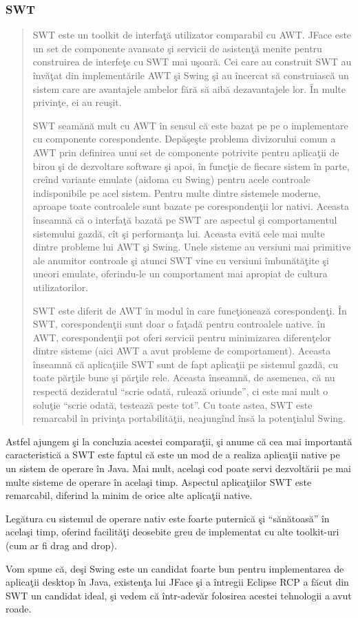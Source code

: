 \subsubsection{SWT}

\begin{quotation}

SWT este un toolkit de interfaţă utilizator comparabil cu AWT. JFace este un set
de componente avansate şi servicii de asistenţă menite pentru construirea de
interfeţe cu SWT mai uşoară. Cei care au construit SWT au învăţat din
implementările AWT şi Swing şi au încercat să construiască un sistem care are
avantajele ambelor fără să aibă dezavantajele lor. În multe privinţe, ei au
reuşit.

SWT seamănă mult cu AWT în sensul că este bazat pe pe o implementare cu
componente corespondente. Depăşeşte problema divizorului comun a AWT prin
definirea unui set de componente potrivite pentru aplicaţii de birou şi de
dezvoltare software şi apoi, în funcţie de fiecare sistem în parte, creînd
variante emulate (aidoma cu Swing) pentru acele controale indisponibile pe acel
sistem. Pentru multe dintre sistemele moderne, aproape toate controalele sunt
bazate pe corespondenţii lor nativi. Aceasta înseamnă că o interfaţă bazată pe
SWT are aspectul şi comportamentul sistemului gazdă, cît şi performanţa lui.
Aceasta evită cele mai multe dintre probleme lui AWT şi Swing. Unele sisteme au
versiuni mai primitive ale anumitor controale şi atunci SWT vine cu versiuni
îmbunătăţite şi uneori emulate, oferindu-le un comportament mai apropiat de
cultura utilizatorilor.

SWT este diferit de AWT în modul în care funcţionează corespondenţi. În SWT,
corespondenţii sunt doar o faţadă pentru controalele native. în AWT,
corespondenţii pot oferi servicii pentru minimizarea diferenţelor dintre sisteme
(aici AWT a avut probleme de comportament). Aceasta înseamnă că aplicaţiile SWT
sunt de fapt aplicaţii pe sistemul gazdă, cu toate părţile bune şi părţile rele.
Aceasta înseamnă, de asemenea, că nu respectă dezideratul ``scrie odată, rulează
oriunde'', ci este mai mult o soluţie ``scrie odată, testează peste tot''. Cu
toate astea, SWT este remarcabil în privinţa portabilităţii, neajungînd însă la
potenţialul Swing.
\cite{swtawtswing}
\end{quotation}

Astfel ajungem şi la concluzia acestei comparaţii, şi anume că cea mai
importantă caracteristică a SWT este faptul că este un mod de a realiza
aplicaţii native pe un sistem de operare în Java. Mai mult, acelaşi cod poate
servi dezvoltării pe mai multe sisteme de operare în acelaşi timp.  Aspectul
aplicaţiilor SWT este remarcabil, diferind la minim de orice alte aplicaţii
native.

Legătura cu sistemul de operare nativ este foarte puternică şi ``sănătoasă'' în
acelaşi timp, oferind facilităţi deosebite greu de implementat cu alte
toolkit-uri (cum ar fi drag and drop).

Vom spune că, deşi Swing este un candidat foarte bun pentru implementarea de
aplicaţii desktop în Java, existenţa lui JFace şi a întregii Eclipse RCP a făcut
din SWT un candidat ideal, şi vedem că într-adevăr folosirea acestei tehnologii
a avut roade.
